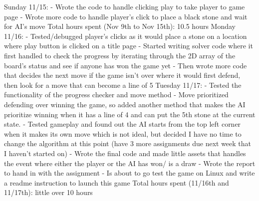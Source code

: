 Sunday 11/15:
-	Wrote the code to handle clicking play to take player to game page
-	Wrote more code to handle player’s click to place a black stone and wait for AI’s move
Total hours spent (Nov 9th to Nov 15th): 10.5 hours
Monday 11/16:
-	Tested/debugged player’s clicks as it would place a stone on a location where play button is clicked on a title page
-	Started writing solver code where it first handled to check the progress by iterating through the 2D array of the board’s status and see if anyone has won the game yet
-	Then wrote more code that decides the next move if the game isn’t over where it would first defend, then look for a move that can become a line of 5
Tuesday 11/17:
-	Tested the functionality of the progress checker and move method
-	Move prioritized defending over winning the game, so added another method that makes the AI prioritize winning when it has a line of 4 and can put the 5th stone at the current state.
-	Tested gameplay and found out the AI starts from the top left corner when it makes its own move which is not ideal, but decided I have no time to change the algorithm at this point (have 3 more assignments due next week that I haven’t started on)
-	Wrote the final code and made little assets that handles the event where either the player or the AI has won/ is a draw
-	Wrote the report to hand in with the assignment
-	Is about to go test the game on Linux and write a readme instruction to launch this game
Total hours spent (11/16th and 11/17th): little over 10 hours
